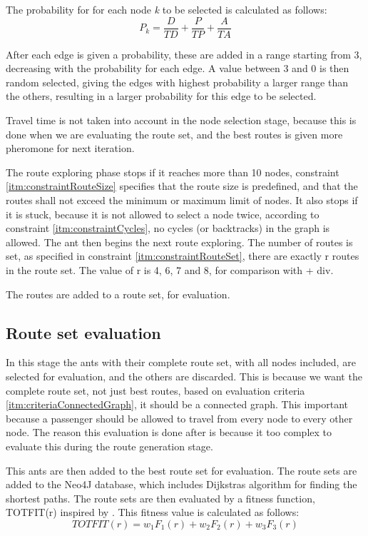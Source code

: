 The probability for for each node \textit{k} to be selected is calculated as follows:
$$ P_{k} = \frac{D}{TD} + \frac{P}{TP} + \frac{A}{TA}$$ 

After each edge is given a probability, these are added in a range starting from 3, decreasing with the probability for each edge. A value between 3 and 0 is then random selected, giving the edges with highest probability a larger range than the others, resulting in a larger probability for this edge to be selected. 

Travel time is not taken into account in the node selection stage, because this is done when we are evaluating the route set, and the best routes is given more pheromone for next iteration. %

The route exploring phase stops if it reaches more than 10 nodes, constraint \ref{itm:constraintRouteSize} specifies that the route size is predefined, and that the routes shall not exceed the minimum or maximum limit of nodes. It also stops if it is stuck, because it is not allowed to select a node twice, according to constraint \ref{itm:constraintCycles}, no cycles (or backtracks) in the graph is allowed. The ant then begins the next route exploring. The number of routes is set, as specified in constraint \ref{itm:constraintRouteSet}, there are exactly r routes in the route set. The value of r is 4, 6, 7 and 8, for comparison with \citep{kechagiopoulos14} + div.

The routes are added to a route set, for evaluation.


\subsection{Route set evaluation}
In this stage the ants with their complete route set, with all nodes included, are selected for evaluation, and the others are discarded. This is because we want the complete route set, not just best routes, based on evaluation criteria \ref{itm:criteriaConnectedGraph}, it should be a connected graph. This important because a passenger should be allowed to travel from every node to every other node. The reason this evaluation is done after is because it too complex to evaluate this during the route generation stage. 

This ants are then added to the best route set for evaluation. 
The route sets are added to the Neo4J database, which includes Dijkstras algorithm for finding the shortest paths. 
The route sets are then evaluated by a fitness function, TOTFIT(r) inspired by \citep{kechagiopoulos14}.
This fitness value is calculated as follows:
$$ TOTFIT(r) = w_{1}F_{1}(r) + w_{2}F_{2}(r) + w_{3}F_{3}(r)$$

